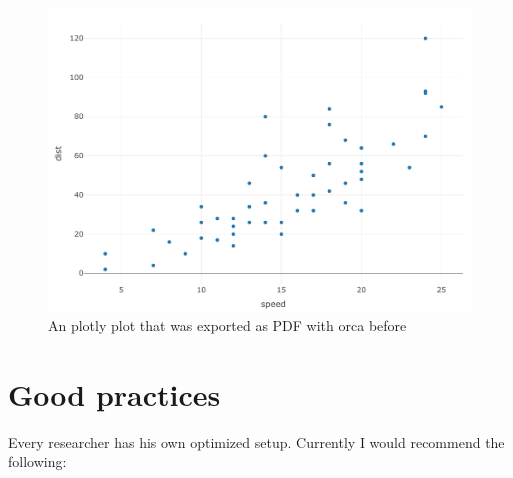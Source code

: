 \documentclass[12pt,]{article}
\theoremstyle{definition}
\theoremstyle{definition}
\theoremstyle{definition}
\theoremstyle{remark}
\begin{document}
\begin{figure}[H]
\centering
\caption{An plotly plot that was exported as PDF with orca before}\label{fig:fig-3}
        \includegraphics[width=0.9\linewidth]{plotly-plot.pdf}
\begin{flushleft}
\end{flushleft}
\end{figure}

\vspace{-1.2cm}

\section{Good practices}\label{good-practices}

Every researcher has his own optimized setup. Currently I would
recommend the following:
\end{document}
